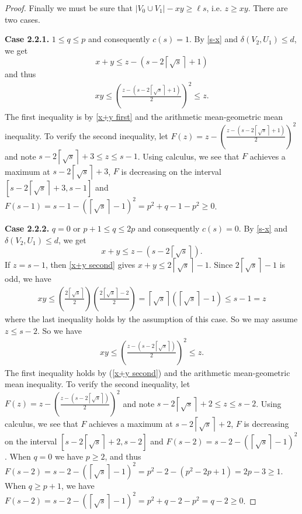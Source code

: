 \documentclass[oneside,12pt]{memoir}
\newcommand{\croot}[1]{\left\lceil\sqrt{#1}\right\rceil}
\begin{document}
\begin{proof}
Finally we must be sure that $|V_0\cup V_1|-xy\geq \ell s$, i.e. $z\geq xy$.  There are two cases.

\textbf{Case 2.2.1.} $1\leq q\leq p$ and consequently $c(s)=1$.  By \eqref{s-x} and $\delta(V_2, U_1)\leq d$, we get 
\begin{equation}
x+y\leq z-(s-2\croot{s}+1)\label{x+y first}
\end{equation}  
and thus
\begin{align*}
xy\leq\left(\frac{z-(s-2\croot{s}+1)}{2}\right)^2\leq z.
\end{align*}
The first inequality is by \eqref{x+y first} and the arithmetic mean-geometric mean inequality.  To verify the second inequality, let $F(z)=z-\left(\frac{z-(s-2\croot{s}+1)}{2}\right)^2$ and note $s-2\croot{s}+3\leq z\leq s-1$.  Using calculus, we see that $F$ achieves a maximum at $s-2\croot{s}+3$, $F$ is decreasing on the interval $[s-2\croot{s}+3, s-1]$ and $F(s-1)=s-1-(\croot{s}-1)^2=p^2+q-1-p^2\geq 0$.

\textbf{Case 2.2.2.} $q=0$ or $p+1\leq q\leq 2p$ and consequently $c(s)=0$.  By \eqref{s-x} and $\delta(V_2, U_1)\leq d$, we get
\begin{equation}
x+y\leq z-(s-2\croot{s}).\label{x+y second}
\end{equation}  
If $z=s-1$, then \eqref{x+y second} gives $x+y\leq 2\croot{s}-1$.  Since $2\croot{s}-1$ is odd, we have
\begin{align*}
xy\leq\left(\frac{2\croot{s}}{2}\right)\left(\frac{2\croot{s}-2}{2}\right)=\croot{s}(\croot{s}-1)\leq s-1=z
\end{align*}
where the last inequality holds by the assumption of this case.  So we may assume $z\leq s-2$.  So we have
\begin{align*}
xy\leq\left(\frac{z-(s-2\croot{s})}{2}\right)^2\leq z.
\end{align*}
The first inequality holds by (\ref{x+y second}) and the arithmetic mean-geometric mean inequality.  To verify the second inequality, let $F(z)=z-\left(\frac{z-(s-2\croot{s})}{2}\right)^2$ and note $s-2\croot{s}+2\leq z\leq s-2$.  Using calculus, we see that $F$ achieves a maximum at $s-2\croot{s}+2$, $F$ is decreasing on the interval $[s-2\croot{s}+2, s-2]$ and $F(s-2)=s-2-(\croot{s}-1)^2$.  When $q=0$ we have $p\geq 2$, and thus $F(s-2)=s-2-(\croot{s}-1)^2=p^2-2-(p^2-2p+1)=2p-3\geq 1$.  When $q\geq p+1$, we have $F(s-2)=s-2-(\croot{s}-1)^2=p^2+q-2-p^2=q-2\geq 0$.

\end{proof}
\end{document}
